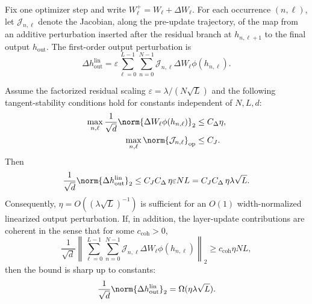 Fix one optimizer step and write $W_\ell^+=W_\ell+\Delta W_\ell$.
For each occurrence $(n,\ell)$, let $\mathcal J_{n,\ell}$ denote the Jacobian, along the pre-update trajectory, of the map from an additive perturbation inserted after the residual branch at $h_{n,\ell+1}$ to the final output $h_{\mathrm{out}}$.
The first-order output perturbation is
\begin{equation}
  \Delta h_{\mathrm{out}}^{\mathrm{lin}}
  =
  \varepsilon
  \sum_{\ell=0}^{L-1}
  \sum_{n=0}^{N-1}
  \mathcal J_{n,\ell}\Delta W_\ell\phi(h_{n,\ell}).
  \label{eq:app-Llayer-lr-linearized}
\end{equation}

\begin{proposition}
\label{prop:Llayer-lr}
Assume the factorized residual scaling $\varepsilon=\lambda/(N\sqrt L)$ and the following tangent-stability conditions hold for constants independent of $N,L,d$:
\begin{align}
  \max_{n,\ell}
  \frac{1}{\sqrt d}
  \norm{\Delta W_\ell\phi(h_{n,\ell})}_2
  &\le C_\Delta\eta,
  \label{eq:app-Llayer-lr-update-scale}\\
  \max_{n,\ell}\norm{\mathcal J_{n,\ell}}_{\mathrm{op}}
  &\le C_J.
  \label{eq:app-Llayer-lr-jacobian}
\end{align}
Then
\[
  \frac{1}{\sqrt d}
  \norm{\Delta h_{\mathrm{out}}^{\mathrm{lin}}}_2
  \le
  C_JC_\Delta\,\eta\varepsilon NL
  =
  C_JC_\Delta\,\eta\lambda\sqrt L.
\]
Consequently, $\eta=O((\lambda\sqrt L)^{-1})$ is sufficient for an $O(1)$ width-normalized linearized output perturbation.
If, in addition, the layer-update contributions are coherent in the sense that for some $c_{\mathrm{coh}}>0$,
\begin{equation}
  \frac{1}{\sqrt d}
  \left\|
  \sum_{\ell=0}^{L-1}
  \sum_{n=0}^{N-1}
  \mathcal J_{n,\ell}\Delta W_\ell\phi(h_{n,\ell})
  \right\|_2
  \ge
  c_{\mathrm{coh}}\eta NL,
  \label{eq:app-Llayer-lr-coherence}
\end{equation}
then the bound is sharp up to constants:
\[
  \frac{1}{\sqrt d}
  \norm{\Delta h_{\mathrm{out}}^{\mathrm{lin}}}_2
  =
  \Omega(\eta\lambda\sqrt L).
\]
\end{proposition}

